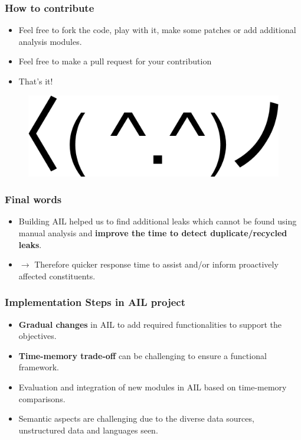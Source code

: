 \documentclass[10pt,aspectratio=169, colorlinks=true, linkcolor=circlBlue]{beamer}
\begin{document}
\begin{frame}
\frametitle{How to contribute}
    \begin{itemize}
        \item Feel free to fork the code, play with it, make some patches or add additional analysis modules.
        \pause
        \item Feel free to make a pull request for your contribution
        \pause
        \item That's it!
    \end{itemize}
    \begin{figure}
        \includegraphics[scale=0.2]{images/dancing.png}
    \end{figure}
\end{frame}



\begin{frame}
   \frametitle{Final words}
   \begin{itemize}
        \item Building AIL helped us to find additional leaks which cannot be found using manual analysis and {\bf improve the time to detect duplicate/recycled leaks}.
            \vskip0.5cm
        \item[] $\rightarrow$ Therefore quicker response time to assist and/or inform proactively affected constituents.
   \end{itemize}
\end{frame}

\begin{frame}
    \frametitle{Implementation Steps in AIL project}
    \begin{itemize}
            \item {\bf Gradual changes} in AIL to add required functionalities to support the objectives.
            \item {\bf Time-memory trade-off} can be challenging to ensure a functional framework.
            \item Evaluation and integration of new modules in AIL based on time-memory comparisons.
            \item Semantic aspects are challenging due to the diverse data sources, unstructured data and languages seen.
    \end{itemize}
\end{frame}
\end{document}
